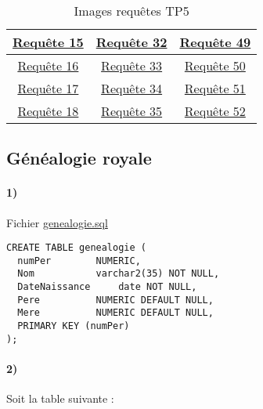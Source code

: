 \documentclass{report}
\begin{document}
\begin{table}[H]
\begin{tabular}{|c|c|c|}
		\hline
		\href{run:./Images/TP5/tp5_15.png}{Requête 15} & \href{run:./Images/TP5/tp5_32.png}{Requête 32} & \href{run:./Images/TP5/tp5_49.png}{Requête 49} \\
		\hline
		\href{run:./Images/TP5/tp5_16.png}{Requête 16} & \href{run:./Images/TP5/tp5_33.png}{Requête 33} & \href{run:./Images/TP5/tp5_50.png}{Requête 50} \\
		\hline
		\href{run:./Images/TP5/tp5_17.png}{Requête 17} & \href{run:./Images/TP5/tp5_34.png}{Requête 34} & \href{run:./Images/TP5/tp5_51.png}{Requête 51} \\
		\hline
		\href{run:./Images/TP5/tp5_18.png}{Requête 18} & \href{run:./Images/TP5/tp5_35.png}{Requête 35} & \href{run:./Images/TP5/tp5_52.png}{Requête 52} \\
		\hline
	\end{tabular}
	\caption{Images requêtes TP5}
\end{table}

\subsection{Généalogie royale}

\paragraph{1)}Fichier \href{./TP5/genealogie.sql}{genealogie.sql}

\begin{lstlisting}
CREATE TABLE genealogie (
  numPer 		NUMERIC,
  Nom 			varchar2(35) NOT NULL,
  DateNaissance 	date NOT NULL,
  Pere 			NUMERIC DEFAULT NULL,
  Mere 			NUMERIC DEFAULT NULL,
  PRIMARY KEY (numPer)
);
\end{lstlisting}

\paragraph{2)}Soit la table suivante :
\end{document}
